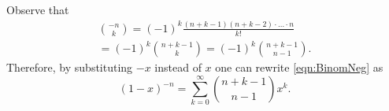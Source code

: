 

\setcounter{section}{2}
\setcounter{subsection}{4}
\setcounter{dfn}{14}

\begin{rem}
Observe that
\begin{multline*}
\binom{-n}{k} = (-1)^k \frac{(n+k-1) (n+k-2) \cdot \ldots \cdot n}{k!}\\
= (-1)^k \binom{n+k-1}{k} = (-1)^k \binom{n+k-1}{n-1}.
\end{multline*}
Therefore, by substituting $-x$ instead of $x$ one can rewrite \eqref{eqn:BinomNeg} as
\[
(1-x)^{-n} = \sum_{k=0}^\infty \binom{n+k-1}{n-1} x^k.
\]
\end{rem}

